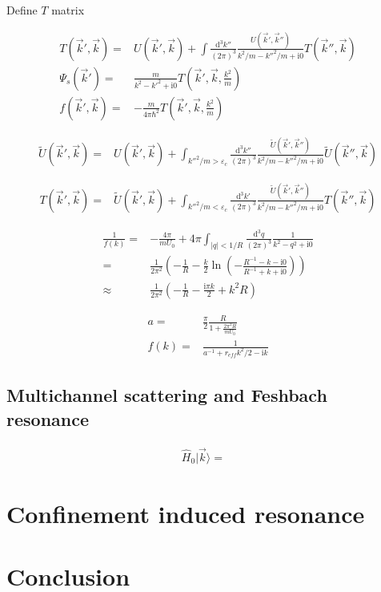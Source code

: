 \documentclass[aps,twocolumn,secnumarabic,balancelastpage,amsmath,amssymb,nofootinbib]{revtex4}
\newcommand{\ud}{\mathrm{d}}
\newcommand{\ui}{\mathrm{i}}
\newcommand{\eqar}[1]
{
  \begin{align*}
    #1
  \end{align*}
}
\newcommand{\paren}[1]{{\left({#1}\right)}}
\newcommand{\abs}[1]{{\left|{#1}\right|}}
\begin{document}
Define $T$ matrix
\eqar{
  T\paren{\vec k', \vec k}=&U\paren{\vec k', \vec k}+\int\frac{\ud^3k''}{\paren{2\pi}^3}\frac{U\paren{\vec k', \vec k''}}{k^2/m-k''^2/m+\ui 0}T\paren{\vec k'', \vec k}\\
  \Psi_s\paren{\vec k'}=&\frac{m}{k^2-k'^2+\ui 0}T\paren{\vec k', \vec k, \frac{k^2}{m}}\\
  f\paren{\vec k', \vec k}=&-\frac{m}{4\pi\hbar^2}T\paren{\vec k', \vec k, \frac{k^2}{m}}
}

\eqar{
  \tilde U\paren{\vec k', \vec k}=&U\paren{\vec k', \vec k}+\int_{k''^2/m>\varepsilon_c}\frac{\ud^3 k''}{\paren{2\pi}^3}\frac{\tilde U\paren{\vec k', \vec k''}}{k^2/m-k''^2/m+\ui 0}\tilde U\paren{\vec k'', \vec k}
}
\eqar{
  T\paren{\vec k', \vec k}=&\tilde U\paren{\vec k', \vec k}+\int_{k''^2/m<\varepsilon_c}\frac{\ud^3 k'}{\paren{2\pi}^3}\frac{\tilde U\paren{\vec k', \vec k''}}{k^2/m-k''^2/m+\ui0}T\paren{\vec k'', \vec k}
}
\eqar{
  \frac{1}{f\paren{k}}=&-\frac{4\pi}{mU_0}+4\pi\int_{\abs{q}<1/R}\frac{\ud^3q}{\paren{2\pi}^3}\frac{1}{k^2-q^2+\ui0}\\
  =&\frac{1}{2\pi^2}\paren{-\frac{1}{R}-\frac{k}{2}\ln\paren{-\frac{R^{-1}-k-\ui0}{R^{-1}+k+\ui0}}}\\
  \approx&\frac{1}{2\pi^2}\paren{-\frac{1}{R}-\frac{\ui\pi k}{2}+k^2R}
}

\eqar{
  a=&\frac{\pi}{2}\frac{R}{1+\frac{2\pi^2R}{mU_0}}\\
  f\paren{k}=&\frac{1}{a^{-1}+r_{eff}k^2/2-\ui k}
}

\subsection{Multichannel scattering and Feshbach resonance}
\eqar{
  \hat H_0|\vec k\rangle=&
}



\section{Confinement induced resonance}





\section{Conclusion}


\end{document}
